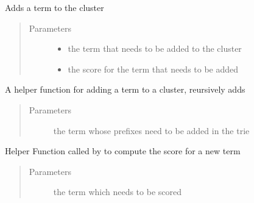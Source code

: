 \documentclass[letterpaper,10pt,english]{sphinxmanual}
\begin{document}
\begin{fulllineitems}
\begin{fulllineitems}
\label{\detokenize{src.cluster:src.cluster.Cluster.Cluster.add_term}}
Adds a term to the cluster
\begin{quote}\begin{description}
\item[{Parameters}] \leavevmode\begin{itemize}
\item {} 
 \textendash{} the term that needs to be added to the cluster

\item {} 
 \textendash{} the score for the term that needs to be added

\end{itemize}

\end{description}\end{quote}

\end{fulllineitems}


\begin{fulllineitems}
\label{\detokenize{src.cluster:src.cluster.Cluster.Cluster.add_to_trie}}
A helper function for adding a term to a cluster, reursively adds
\begin{quote}\begin{description}
\item[{Parameters}] \leavevmode
{} \textendash{} the term whose prefixes need to be added in the trie

\end{description}\end{quote}

\end{fulllineitems}


\begin{fulllineitems}
\label{\detokenize{src.cluster:src.cluster.Cluster.Cluster.fuzzy_match_score}}
Helper Function called by  to compute the score for a new term
\begin{quote}\begin{description}
\item[{Parameters}] \leavevmode
{} \textendash{} the term which needs to be scored


\end{description}
\end{quote}
\end{fulllineitems}
\end{fulllineitems}
\end{document}
